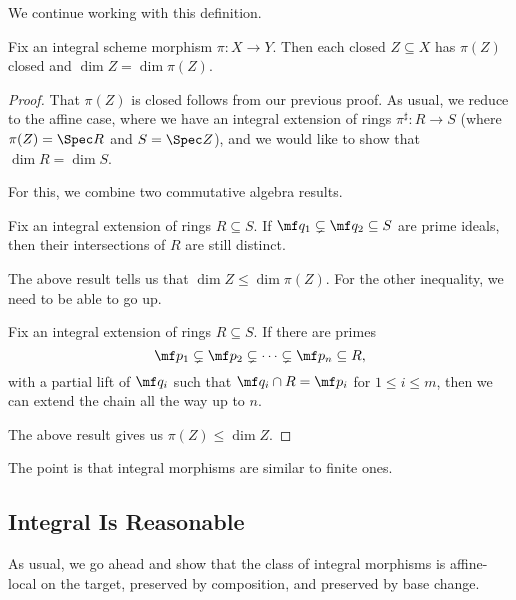 \documentclass[../notes.tex]{subfiles}
\begin{document}
We continue working with this definition.
\begin{prop}
	Fix an integral scheme morphism $\pi\colon X\to Y$. Then each closed $Z\subseteq X$ has $\pi(Z)$ closed and $\dim Z=\dim\pi(Z)$.
\end{prop}
\begin{proof}
	That $\pi(Z)$ is closed follows from our previous proof. As usual, we reduce to the affine case, where we have an integral extension of rings $\pi^\sharp\colon R\to S$ (where $\pi(Z)=\Spec R$ and $S=\Spec Z$), and we would like to show that $\dim R=\dim S$.

	For this, we combine two commutative algebra results.
	\begin{lemma}
		Fix an integral extension of rings $R\subseteq S$. If $\mf q_1\subsetneq\mf q_2\subseteq S$ are prime ideals, then their intersections of $R$ are still distinct.
	\end{lemma}
	The above result tells us that $\dim Z\le\dim\pi(Z)$. For the other inequality, we need to be able to go up.
	\begin{lemma}[Going up]
		Fix an integral extension of rings $R\subseteq S$. If there are primes
		\[\mf p_1\subsetneq\mf p_2\subsetneq\cdots\subsetneq\mf p_n\subseteq R,\]
		with a partial lift of $\mf q_i$ such that $\mf q_i\cap R=\mf p_i$ for $1\le i\le m$, then we can extend the chain all the way up to $n$.
	\end{lemma}
	The above result gives us $\pi(Z)\le\dim Z$.
\end{proof}
The point is that integral morphisms are similar to finite ones.

\subsection{Integral Is Reasonable}
As usual, we go ahead and show that the class of integral morphisms is affine-local on the target, preserved by composition, and preserved by base change.
\end{document}
